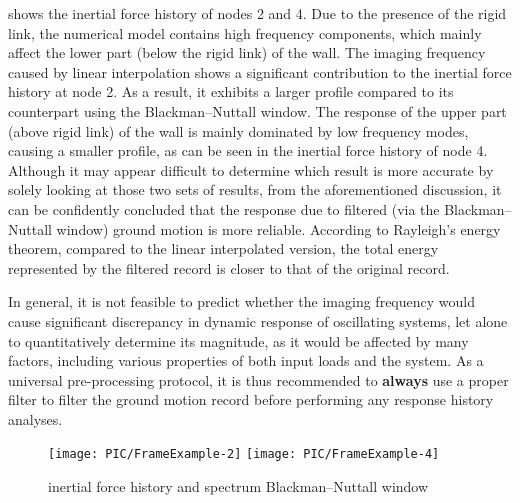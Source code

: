  shows the inertial force history of nodes 2 and 4. Due to the presence of the rigid link, the numerical model contains high frequency components, which mainly affect the lower part (below the rigid link) of the wall. The imaging frequency caused by linear interpolation shows a significant contribution to the inertial force history at node 2. As a result, it exhibits a larger profile compared to its counterpart using the Blackman--Nuttall window. The response of the upper part (above rigid link) of the wall is mainly dominated by low frequency modes, causing a smaller profile, as can be seen in the inertial force history of node 4. Although it may appear difficult to determine which result is more accurate by solely looking at those two sets of results, from the aforementioned discussion, it can be confidently concluded that the response due to filtered (via the Blackman--Nuttall window) ground motion is more reliable. According to Rayleigh’s energy theorem, compared to the linear interpolated version, the total energy represented by the filtered record is closer to that of the original record.

In general, it is not feasible to predict whether the imaging frequency would cause significant discrepancy in dynamic response of oscillating systems, let alone to quantitatively determine its magnitude, as it would be affected by many factors, including various properties of both input loads and the system. As a universal pre-processing protocol, it is thus recommended to \textbf{always} use a proper filter to filter the ground motion record before performing any response history analyses.
\begin{figure}[htb!]
\centering
\texttt{[image: PIC/FrameExample-2]}
\texttt{[image: PIC/FrameExample-4]}
\caption{inertial force history and spectrum Blackman--Nuttall window}\label{fig:practical_example}
\end{figure}